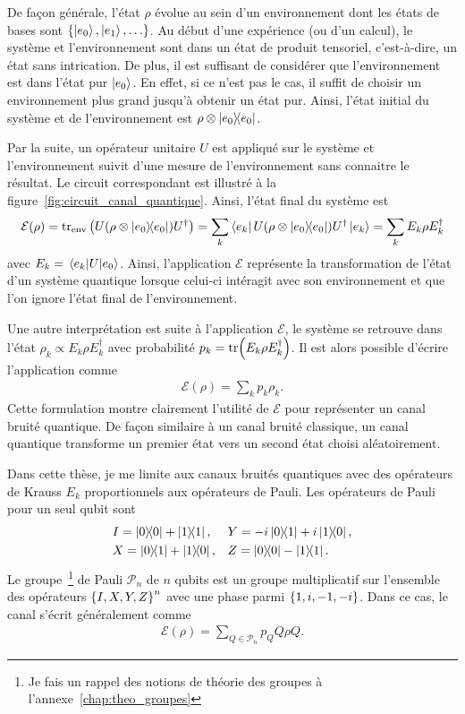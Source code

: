 De façon générale,
l'état $\rho$ évolue au sein d'un environnement dont les états de bases 
sont $\qty{\ket{e_0}, \ket{e_1}, \ldots}$.
Au début d'une expérience (ou d'un calcul),
le système et l'environnement sont dans un état de produit tensoriel,
c'est-à-dire, un état sans intrication.
De plus, il est suffisant de considérer que l'environnement est dans l'état 
pur $\ket{e_0}$.
En effet,
si ce n'est pas le cas, il suffit de choisir un environnement plus grand jusqu'à 
obtenir un état pur.
Ainsi,
l'état initial du système et de l'environnement est $\rho \otimes \op{e_0}$.

Par la suite,
un opérateur unitaire $U$ est appliqué sur le système et l'environnement suivit d'une
mesure de l'environnement sans connaitre le résultat.
Le circuit correspondant est illustré à la figure~\ref{fig:circuit_canal_quantique}.
Ainsi, l'état final du système est
\begin{equation}
  \mathcal{E}(\rho) 
  = \tr_{\text{env}}\qty(U(\rho \otimes \op{e_0})U^\dag)
  = \sum_k \bra{e_k}U(\rho \otimes \op{e_0}) U^\dag \ket{e_k}
  = \sum_k E_k \rho E_k^\dag
\end{equation}
avec $E_k = \mel{e_k}{U}{e_0}$.
Ainsi,
l'application $\mathcal{E}$ représente la transformation de l'état d'un système quantique
lorsque celui-ci intéragit avec son environnement et que l'on ignore l'état final
de l'environnement.

Une autre interprétation est suite à l'application $\mathcal E$,
le système se retrouve dans l'état $\rho_k \propto E_k \rho E_k^\dag$
avec probabilité $p_k = \tr(E_k \rho E_k^\dag)$.
Il est alors possible d'écrire l'application comme
\begin{align}
  \mathcal E(\rho) = \sum_k p_k \rho_k.
\end{align}
Cette formulation montre clairement l'utilité de $\mathcal E$ pour
représenter un canal bruité quantique.
De façon similaire à un canal bruité classique,
un canal quantique transforme un premier état 
vers un second état choisi aléatoirement.

Dans cette thèse,
je me limite aux canaux bruités quantiques avec des opérateurs 
de Krauss $E_k$ proportionnels aux opérateurs de Pauli.
Les opérateurs de Pauli pour un seul qubit sont 
\begin{align}
  &I = \op{0}{0} + \op{1}{1}, 
  &&Y = -i\op{0}{1} + i\op{1}{0}, \notag \\
  &X = \op{0}{1} + \op{1}{0}, 
  &&Z = \op{0}{0} - \op{1}{1}.
\end{align}
Le groupe~\footnote{Je fais un rappel des notions de théorie des groupes à l'annexe~\ref{chap:theo_groupes}}
de Pauli $\mathcal P_n$ de $n$ qubits est un groupe multiplicatif sur 
l'ensemble des opérateurs $\qty{I, X, Y, Z}^n$ avec une phase parmi $\qty{1, i, -1, -i}$.
Dans ce cas,
le canal s'écrit généralement comme
\begin{align}
  \mathcal E(\rho) = \sum_{Q \in \mathcal P_n} p_Q Q\rho Q.
\end{align}


